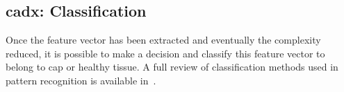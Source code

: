 \subsection{\acs*{cadx}: Classification} \label{subsec:chp3:img-clas:CADX-clas}


Once the feature vector has been extracted and eventually the complexity
reduced, it is possible to make a decision and classify this feature vector to
belong to \ac{cap} or healthy tissue.
A full review of classification methods used in pattern recognition is
available in~\cite{Bishop2006}.

